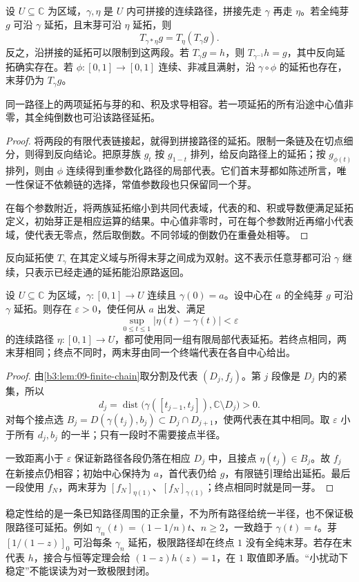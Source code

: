 \begin{proposition}[延拓与路径运算]\label{b3:prop:09-continuation-calculus}
设 \(U\subseteq\mathbb C\) 为区域，\(\gamma,\eta\) 是 \(U\) 内可拼接的连续路径，拼接先走 \(\gamma\) 再走 \(\eta\)。若全纯芽 \(g\) 可沿 \(\gamma\) 延拓，且末芽可沿 \(\eta\) 延拓，则
\[
 T_{\gamma*\eta}g=T_\eta(T_\gamma g).
\]
反之，沿拼接的延拓可以限制到这两段。若 \(T_\gamma g=h\)，则 \(T_{\gamma^{-1}}h=g\)，其中反向延拓确实存在。若 \(\phi:[0,1]\to[0,1]\) 连续、非减且满射，沿 \(\gamma\circ\phi\) 的延拓也存在，末芽仍为 \(T_\gamma g\)。

\ProseParagraphBreak
同一路径上的两项延拓与芽的和、积及求导相容。若一项延拓的所有沿途中心值非零，其全纯倒数也可沿该路径延拓。
\end{proposition}
\begin{proof}
将两段的有限代表链接起，就得到拼接路径的延拓。限制一条链及在切点细分，则得到反向结论。把原芽族 \(g_t\) 按 \(g_{1-t}\) 排列，给反向路径上的延拓；按 \(g_{\phi(t)}\) 排列，则由 \(\phi\) 连续得到重参数化路径的局部代表。它们首末芽都如陈述所言，唯一性保证不依赖链的选择，常值参数段也只保留同一个芽。

在每个参数附近，将两族延拓缩小到共同代表域，代表的和、积或导数便满足延拓定义，初始芽正是相应运算的结果。中心值非零时，可在每个参数附近再缩小代表域，使代表无零点，然后取倒数。不同邻域的倒数仍在重叠处相等。
\end{proof}
反向延拓使 \(T_\gamma\) 在其定义域与所得末芽之间成为双射。这不表示任意芽都可沿 \(\gamma\) 继续，只表示已经走通的延拓能沿原路返回。

\begin{lemma}[有限链稳定性]\label{b3:lem:09-continuation-stability}
设 \(U\subseteq\mathbb C\) 为区域，\(\gamma:[0,1]\to U\) 连续且 \(\gamma(0)=a\)。设中心在 \(a\) 的全纯芽 \(g\) 可沿 \(\gamma\) 延拓。则存在 \(\varepsilon>0\)，使任何从 \(a\) 出发、满足
\[
 \sup_{0\le t\le1}|\eta(t)-\gamma(t)|<\varepsilon
\]
的连续路径 \(\eta:[0,1]\to U\)，都可使用同一组有限局部代表延拓。若终点相同，两末芽相同；终点不同时，两末芽由同一个终端代表在各自中心给出。
\end{lemma}
\begin{proof}
由\cref{b3:lem:09-finite-chain}取分割及代表 \((D_j,f_j)\)。第 \(j\) 段像是 \(D_j\) 内的紧集，所以
\[
 d_j=\operatorname{dist}\bigl(\gamma([t_{j-1},t_j]),\mathbb C\setminus D_j\bigr)>0.
\]
对每个接点选 \(B_j=D(\gamma(t_j),b_j)\subset D_j\cap D_{j+1}\)，使两代表在其中相同。取 \(\varepsilon\) 小于所有 \(d_j,b_j\) 的一半；只有一段时不需要接点半径。

一致距离小于 \(\varepsilon\) 保证新路径各段仍落在相应 \(D_j\) 中，且接点 \(\eta(t_j)\in B_j\)。故 \(f_j\) 在新接点仍相容；初始中心保持为 \(a\)，首代表仍给 \(g\)，有限链引理给出延拓。最后一段使用 \(f_N\)，两末芽为 \([f_N]_{\eta(1)}\)、\([f_N]_{\gamma(1)}\)；终点相同时就是同一芽。
\end{proof}
稳定性给的是一条已知路径周围的正余量，不为所有路径给统一半径，也不保证极限路径可延拓。例如 \(\gamma_n(t)=(1-1/n)t\)、\(n\ge2\)，一致趋于 \(\gamma(t)=t\)。芽 \([1/(1-z)]_0\) 可沿每条 \(\gamma_n\) 延拓，极限路径却在终点 \(1\) 没有全纯末芽。若存在末代表 \(h\)，接合与恒等定理会给 \((1-z)h(z)=1\)，在 \(1\) 取值即矛盾。“小扰动下稳定”不能误读为对一致极限封闭。

